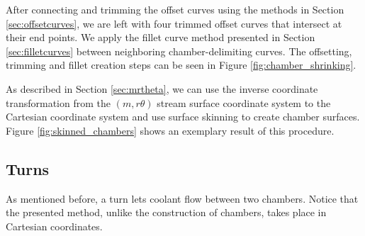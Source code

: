 \documentclass[a4paper, 11pt]{report}
\theoremstyle{definition}
\begin{document}
	After connecting and trimming the offset curves using the methods in Section \ref{sec:offsetcurves}, we are left with four trimmed offset curves that intersect at their end points. We apply the fillet curve method presented in Section \ref{sec:filletcurves} between neighboring chamber-delimiting curves. The offsetting, trimming and fillet creation steps can be seen in Figure \ref{fig:chamber_shrinking}.

	As described in Section \ref{sec:mrtheta}, we can use the inverse coordinate transformation from the $(m, r\theta)$ stream surface coordinate system to the Cartesian coordinate system and use surface skinning to create chamber surfaces. Figure \ref{fig:skinned_chambers} shows an exemplary result of this procedure.

\subsection{Turns}
	As mentioned before, a turn lets coolant flow between two chambers. Notice that the presented method, unlike the construction of chambers, takes place in Cartesian coordinates.
\end{document}
